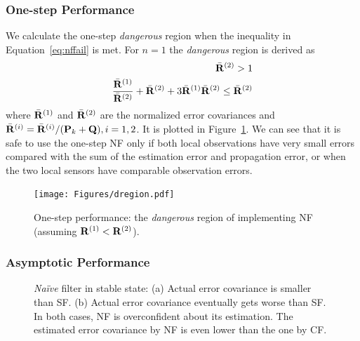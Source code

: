 \subsubsection{One-step Performance}

We calculate the one-step \textit{dangerous} region when the inequality in Equation~\eqref{eq:nffail} is met. For $n=1$ the \textit{dangerous} region is derived as
\begin{equation}
\label{eq:danger}
\begin{split}
{\bar{\bf R}}^{(2)}>1\\
\frac{{\bar{\bf R}}^{(1)}}{{\bar{\bf R}}^{(2)}}+{\bar{\bf R}}^{(2)}+3{\bar{\bf R}}^{(1)}{\bar{\bf R}}^{(2)}\leq {\bar{\bf R}}^{(2)}\\
\end{split}
\end{equation}
where $\bar{\bf R}^{(1)}$ and $\bar{\bf R}^{(2)}$ are the normalized error covariances and $\bar{\bf R}^{(i)}=\bar{\bf R}^{(i)}/({\bf P}_k+{\bf Q}),i=1,2$. It is plotted in Figure~\ref{dregion}. We can see that it is safe to use the one-step NF only if both local observations have very small errors compared with the sum of the estimation error and propagation error, or when the two local sensors have comparable observation errors.

\begin{figure}[htbp]
\centering
\texttt{[image: Figures/dregion.pdf]}
\caption{One-step performance: the \textit{dangerous} region of implementing NF (assuming ${\bf R}^{(1)}<{\bf R}^{(2)}$).}
\label{dregion}
\end{figure}

\subsubsection{Asymptotic Performance}

\begin{figure}[htbp]
\begin{center}
\caption{\textit{Na\"ive} filter in stable state: (a) Actual error covariance is smaller than SF. (b) Actual error covariance eventually gets worse than SF. In both cases, NF is overconfident about its estimation. The estimated error covariance by NF is even lower than the one by CF.}
\label{fig:nf_eg}
\end{center}
\end{figure}

